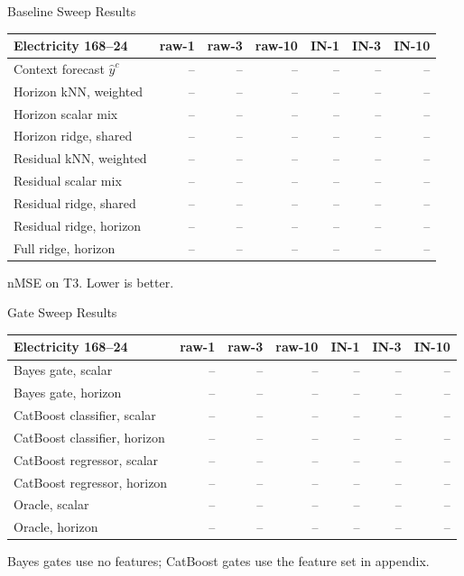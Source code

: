 \begin{frame}{Baseline Sweep Results}
  \tiny
  \centering
  \begin{tabular}{lrrrrrr}
    \toprule
    \textbf{Electricity 168--24} &
    \textbf{raw-1} & \textbf{raw-3} & \textbf{raw-10} &
    \textbf{IN-1} & \textbf{IN-3} & \textbf{IN-10} \\
    \midrule
    Context forecast $\hat y^c$ & -- & -- & -- & -- & -- & -- \\
    Horizon kNN, weighted & -- & -- & -- & -- & -- & -- \\
    Horizon scalar mix & -- & -- & -- & -- & -- & -- \\
    Horizon ridge, shared & -- & -- & -- & -- & -- & -- \\
    Residual kNN, weighted & -- & -- & -- & -- & -- & -- \\
    Residual scalar mix & -- & -- & -- & -- & -- & -- \\
    Residual ridge, shared & -- & -- & -- & -- & -- & -- \\
    Residual ridge, horizon & -- & -- & -- & -- & -- & -- \\
    Full ridge, horizon & -- & -- & -- & -- & -- & -- \\
    \bottomrule
  \end{tabular}

  \vspace{0.25cm}
  \scriptsize nMSE on T3. Lower is better.
\end{frame}

\begin{frame}{Gate Sweep Results}
  \tiny
  \centering
  \begin{tabular}{lrrrrrr}
    \toprule
    \textbf{Electricity 168--24} &
    \textbf{raw-1} & \textbf{raw-3} & \textbf{raw-10} &
    \textbf{IN-1} & \textbf{IN-3} & \textbf{IN-10} \\
    \midrule
    Bayes gate, scalar & -- & -- & -- & -- & -- & -- \\
    Bayes gate, horizon & -- & -- & -- & -- & -- & -- \\
    CatBoost classifier, scalar & -- & -- & -- & -- & -- & -- \\
    CatBoost classifier, horizon & -- & -- & -- & -- & -- & -- \\
    CatBoost regressor, scalar & -- & -- & -- & -- & -- & -- \\
    CatBoost regressor, horizon & -- & -- & -- & -- & -- & -- \\
    Oracle, scalar & -- & -- & -- & -- & -- & -- \\
    Oracle, horizon & -- & -- & -- & -- & -- & -- \\
    \bottomrule
  \end{tabular}

  \vspace{0.25cm}
  \scriptsize Bayes gates use no features; CatBoost gates use the feature set in appendix.
\end{frame}


